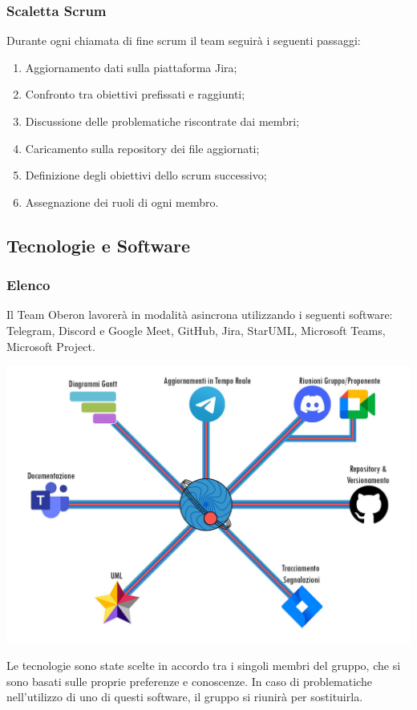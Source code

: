\subsubsection{Scaletta Scrum}
Durante ogni chiamata di fine scrum il team seguirà i seguenti passaggi:
\begin{enumerate}
    \item Aggiornamento dati sulla piattaforma Jira;
    \item Confronto tra obiettivi prefissati e raggiunti;
    \item Discussione delle problematiche riscontrate dai membri;
    \item Caricamento sulla repository dei file aggiornati;
    \item Definizione degli obiettivi dello scrum successivo;
    \item Assegnazione dei ruoli di ogni membro.
\end{enumerate}

\subsection{Tecnologie e Software}
\subsubsection{Elenco}
Il Team Oberon lavorerà in modalità asincrona utilizzando i seguenti software: Telegram, Discord e Google Meet, GitHub, Jira, StarUML, Microsoft Teams, Microsoft Project. \newline
\begin{center}
    \includegraphics[scale = 1.0]{img/tecnologie.png}\\[1cm] 
\end{center}
Le tecnologie sono state scelte in accordo tra i singoli membri del gruppo, che si sono basati sulle proprie preferenze e conoscenze. In caso di problematiche nell’utilizzo di uno di questi software, il gruppo si riunirà per sostituirla. 
